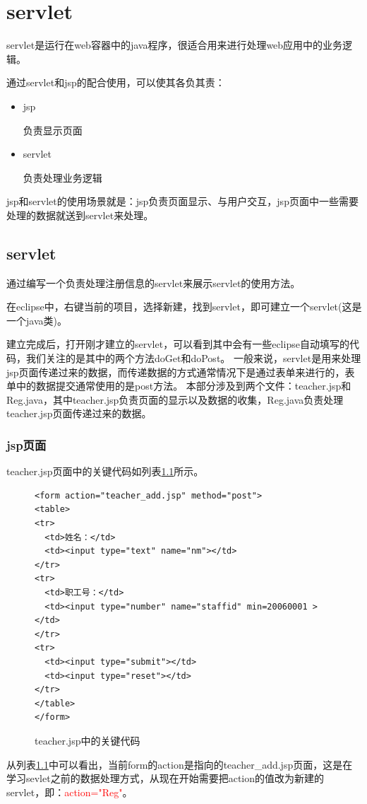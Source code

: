 \chapter{servlet}
servlet是运行在web容器中的java程序，很适合用来进行处理web应用中的业务逻辑。

通过servlet和jsp的配合使用，可以使其各负其责：
\begin{itemize}
\item jsp

负责显示页面
\item servlet

负责处理业务逻辑
\end{itemize}
jsp和servlet的使用场景就是：jsp负责页面显示、与用户交互，jsp页面中一些需要处理的数据就送到servlet来处理。
\section{servlet}
通过编写一个负责处理注册信息的servlet来展示servlet的使用方法。

在eclipse中，右键当前的项目，选择新建，找到servlet，即可建立一个servlet(这是一个java类)。

建立完成后，打开刚才建立的servlet，可以看到其中会有一些eclipse自动填写的代码，我们关注的是其中的两个方法doGet和doPost。
一般来说，servlet是用来处理jsp页面传递过来的数据，而传递数据的方式通常情况下是通过表单来进行的，表单中的数据提交通常使用的是post方法。
本部分涉及到两个文件：teacher.jsp和Reg.java，其中teacher.jsp负责页面的显示以及数据的收集，Reg.java负责处理teacher.jsp页面传递过来的数据。
\subsection{jsp页面}
teacher.jsp页面中的关键代码如列表\ref{teacherjsp}所示。
\begin{figure}
\begin{lstlisting}
<form action="teacher_add.jsp" method="post">
<table>
<tr>
  <td>姓名：</td>
  <td><input type="text" name="nm"></td>
</tr>
<tr>
  <td>职工号：</td>
  <td><input type="number" name="staffid" min=20060001 ></td>
</tr>
<tr>
  <td><input type="submit"></td>
  <td><input type="reset"></td>
</tr>
</table>
</form>
\end{lstlisting}
\caption{teacher.jsp中的关键代码}
\label{teacherjsp}
\end{figure}
从列表\ref{teacherjsp}中可以看出，当前form的action是指向的teacher\_add.jsp页面，这是在学习sevlet之前的数据处理方式，从现在开始需要把action的值改为新建的servlet，即：\textcolor{red}{action="Reg"}。
